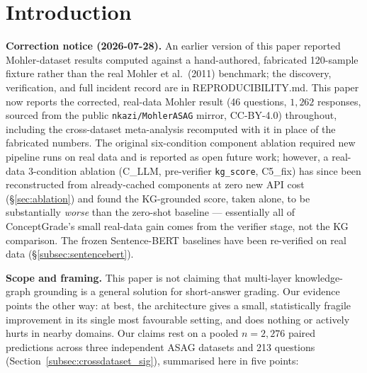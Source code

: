 \documentclass[conference]{IEEEtran}
\begin{document}
\section{Introduction}
\label{sec:intro}

\textbf{Correction notice (2026-07-28).} An earlier version of this paper
reported Mohler-dataset results computed against a hand-authored,
fabricated 120-sample fixture rather than the real Mohler et al.\ (2011)
benchmark; the discovery, verification, and full incident record are in
REPRODUCIBILITY.md. This paper now reports the corrected, real-data
Mohler result (46 questions, $1{,}262$ responses, sourced from the
public \texttt{nkazi/MohlerASAG} mirror, CC-BY-4.0) throughout, including
the cross-dataset meta-analysis recomputed with it in place of the
fabricated numbers. The original six-condition component ablation
required new pipeline runs on real data and is reported as open future
work; however, a real-data 3-condition ablation (C\_LLM,
pre-verifier \texttt{kg\_score}, C5\_fix) has since been reconstructed
from already-cached components at zero new API cost
(\S\ref{sec:ablation}) and found the KG-grounded score, taken alone, to
be substantially \emph{worse} than the zero-shot baseline --- essentially
all of ConceptGrade's small real-data gain comes from the verifier
stage, not the KG comparison. The frozen Sentence-BERT baselines have
been re-verified on real data (\S\ref{subsec:sentencebert}).

\textbf{Scope and framing.} This paper is not claiming that multi-layer
knowledge-graph grounding is a general solution for short-answer
grading. Our evidence points the other way: at best, the architecture
gives a small, statistically fragile improvement in its single most
favourable setting, and does nothing or actively hurts in nearby
domains. Our claims rest on a pooled $n = 2{,}276$ paired predictions
across three independent ASAG datasets and 213 questions
(Section~\ref{subsec:crossdataset_sig}), summarised here in five points:
\end{document}
